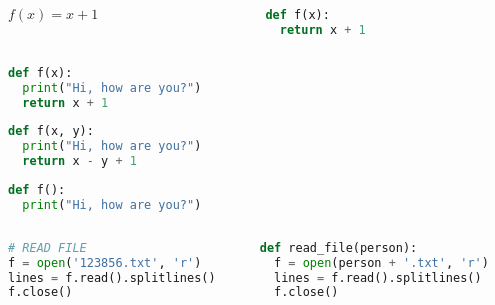 \documentclass[aspectratio=169]{beamer}
\begin{document}
\begin{frame}[fragile]
\begin{columns}
\begin{column}{0.5\textwidth}
\LARGE
$f(x) = x + 1$
\end{column}
\begin{column}{0.5\textwidth}
\begin{lstlisting}[basicstyle=\LARGE,language=python]
def f(x):
  return x + 1
\end{lstlisting}
\end{column}
\end{columns}
\end{frame}

\begin{frame}[fragile]
\begin{lstlisting}[basicstyle=\large,language=python]
def f(x):
  print("Hi, how are you?")
  return x + 1
\end{lstlisting}
\end{frame}

\begin{frame}[fragile]
\begin{lstlisting}[basicstyle=\large,language=python]
def f(x, y):
  print("Hi, how are you?")
  return x - y + 1
\end{lstlisting}
\end{frame}

\begin{frame}[fragile]
\begin{lstlisting}[basicstyle=\large,language=python]
def f():
  print("Hi, how are you?")
\end{lstlisting}
\end{frame}

\begin{frame}[fragile]
\begin{columns}
\begin{column}{0.5\textwidth}
\begin{lstlisting}[basicstyle=\small,language=python]
# READ FILE
f = open('123856.txt', 'r')
lines = f.read().splitlines()
f.close()
\end{lstlisting}
\end{column}
\begin{column}{0.5\textwidth}
\begin{lstlisting}[basicstyle=\small,language=python]
def read_file(person):
  f = open(person + '.txt', 'r')
  lines = f.read().splitlines()
  f.close()
\end{lstlisting}
\end{column}
\end{columns}
\end{frame}
\end{document}

